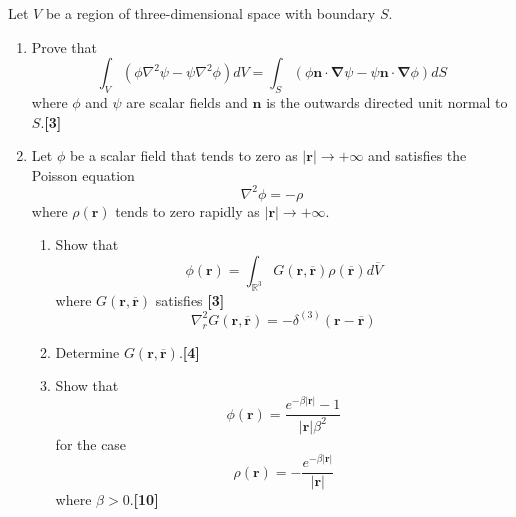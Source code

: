 \documentclass[a4paper]{article}
\begin{document}
\newpage
\begin{qns}
Let $V$ be a region of three-dimensional space with boundary $S$.
\begin{enumerate}[label=(\alph*)]
\item Prove that
$$\int_V(\phi\nabla^2\psi-\psi\nabla^2\phi)dV=\int_S(\phi\mathbf{n}\cdot\boldsymbol{\nabla}\psi-\psi\mathbf{n}\cdot\boldsymbol{\nabla}\phi)dS$$
where $\phi$ and $\psi$  are scalar fields and $\mathbf{n}$ is the outwards directed unit normal to $S$.\hfill\textbf{[3]}
\item Let $\phi$ be a scalar field that tends to zero as $|\mathbf{r}|\rightarrow+\infty$ and satisfies the Poisson equation
$$\nabla^2\phi=-\rho$$
where $\rho(\mathbf{r})$ tends to zero rapidly as $|\mathbf{r}|\rightarrow+\infty$.
\begin{enumerate}[label=(\roman*)]
\item Show that
$$\phi(\mathbf{r})=\int_{\mathbb{R}^3}G(\mathbf{r},\mathbf{\overline{r}})\rho(\mathbf{\overline{r}})d\overline{V}$$
where $G(\mathbf{r},\mathbf{\overline{r}})$ satisfies \hfill\textbf{[3]}
$$\nabla_r^2G(\mathbf{r},\mathbf{\overline{r}})=-\delta^{(3)}(\mathbf{r}-\mathbf{\overline{r}})$$
\item Determine $G(\mathbf{r},\mathbf{\overline{r}})$.\hfill\textbf{[4]}
\item Show that
$$\phi(\mathbf{r})=\frac{e^{-\beta|\mathbf{r}|}-1}{|\mathbf{r}|\beta^2}$$
for the case
$$\rho(\mathbf{r})=-\frac{e^{-\beta|\mathbf{r}|}}{|\mathbf{r}|}$$
where $\beta>0$.\hfill\textbf{[10]}
\end{enumerate}
\end{enumerate}
\end{qns}
\end{document}

